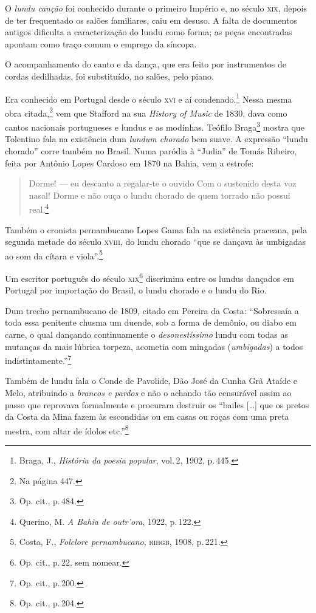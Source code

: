 O \textit{lundu canção} foi conhecido durante o primeiro Império e, no século \textsc{xix},
depois de ter frequentado os salões familiares, caiu em desuso. A falta
de documentos antigos dificulta a caracterização do lundu como forma; as
peças encontradas apontam como traço comum o emprego da síncopa.

O acompanhamento do canto e da dança, que era feito por instrumentos de
cordas dedilhadas, foi substituído, no salões, pelo piano. %

Era conhecido em Portugal desde o século \textsc{xvi} e aí condenado.\footnote{Braga, J.,
\textit{História da poesia popular}, vol.\,2, 1902, p.\,445.} Nessa mesma obra
citada,\footnote{Na página 447.} vem que Stafford na sua \textit{History of Music} de 1830,
dava como cantos nacionais portugueses e lundus e as modinhas. Teófilo
Braga\footnote{Op. cit., p.\,484.} mostra que Tolentino fala na existência dum
\textit{lundum chorado} bem suave. A expressão ``lundu chorado'' corre também
no Brasil. Numa paródia à ``Judia'' de Tomás Ribeiro, feita por
Antônio Lopes Cardoso em 1870 na Bahia, vem a estrofe:

\begin{quote}
\small{
Dorme! --- eu descanto a regalar-te o ouvido
Com o sustenido desta voz nasal!
Dorme e não ouça o lundu chorado
de quem torrado não possui real.}\footnote{Querino,
M. \textit{A Bahia de outr'ora}, 1922, p.\,122.} %
\end{quote}

Também o cronista pernambucano Lopes Gama fala na existência praceana,
pela segunda metade do século \textsc{xviii}, do lundu chorado ``que se dançava às
umbigadas ao som da cítara e viola''.\footnote{Costa, F., \textit{Folclore pernambucano},
\textsc{rihgb}, 1908, p.\,221.}

Um escritor português do século \textsc{xix}\footnote{Op. cit., p.\,22, sem nomear.}
discrimina entre os lundus dançados em Portugal por importação do
Brasil, o lundu chorado e o lundu do Rio. %

Dum trecho pernambucano de 1809, citado em Pereira da Costa: ``Sobressaía a toda essa penitente chusma um duende, sob a forma de demônio, ou diabo em carne, o qual dançando continuamente o
\textit{desonestíssimo} lundu com todas as mutanças da mais lúbrica torpeza,
acometia com mingadas (\textit{umbigadas}) a todos indistintamente.''\footnote{Op. cit.,
p.\,200.}

Também de lundu fala o Conde de Pavolide, Dão José da Cunha Grã Ataíde e
Melo, atribuindo a \textit{brancos e pardos} e não o achando tão censurável
assim ao passo que reprovava formalmente e procurara destruir os
``bailes {[}\ldots{}{]} que os pretos da Costa da Mina fazem às escondidas ou em
casas ou roças com uma preta mestra, com altar de ídolos etc.''\footnote{Op. cit., p.\,204.} %

